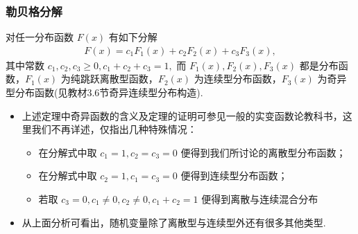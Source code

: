 \begin{frame}
	\frametitle{勒贝格分解}
	\begin{thm}[勒贝格分解] 对任一分布函数 $F (x)$ 有如下分解
		\begin{eqnarray*}
			F(x)=c_1F_1(x)+c_2F_2(x)+c_3F_3(x),
		\end{eqnarray*}
		其中常数 $c_1,c_2,c_3\ge 0, c_1+c_2+c_3=1,$ 而 $F_1 (x),F_2 (x),F_3 (x)$ 都是分布函数，$F_1 (x)$ 为纯跳跃离散型函数，$F_2 (x)$ 为连续型分布函数，$F_3 (x)$ 为奇异型分布函数(见教材3.6节奇异连续型分布构造).
	\end{thm}
	\vspace{0.3cm}
	\pause
	\begin{itemize}[<+-|alert@+>]
		\item 上述定理中奇异函数的含义及定理的证明可参见一般的实变函数论教科书，这里我们不再详述，仅指出几种特殊情况：
		      \begin{itemize}
			      \item 在分解式中取 $c_1=1,c_2=c_3=0$ 便得到我们所讨论的离散型分布函数；
			      \item 在分解式中取 $c_2=1,c_1=c_3=0$ 便得到连续型分布函数；
			      \item 若取 $c_3=0, c_1\neq 0, c_2\neq 0, c_1+c_2=1$ 便得到离散与连续混合分布
		      \end{itemize}
		\item 从上面分析可看出，随机变量除了离散型与连续型外还有很多其他类型.
	\end{itemize}

\end{frame}



